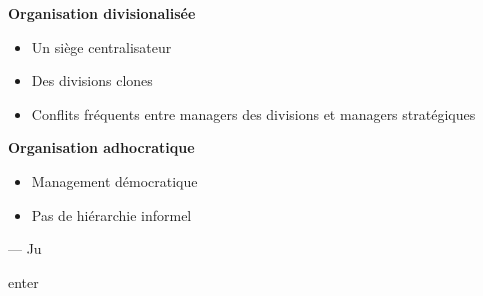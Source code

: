 \documentclass[12pt]{article}
\begin{document}
\textbf{Organisation divisionalisée}
\begin{itemize}
\item Un siège centralisateur
\item Des divisions clones
\item Conflits fréquents entre managers des divisions et managers stratégiques
\end{itemize}


\textbf{Organisation adhocratique}
\begin{itemize}
\item Management démocratique
\item Pas de hiérarchie informel
\end{itemize}


\hspace{1 cm}--- Ju

\newpage


enter
\end{document}
